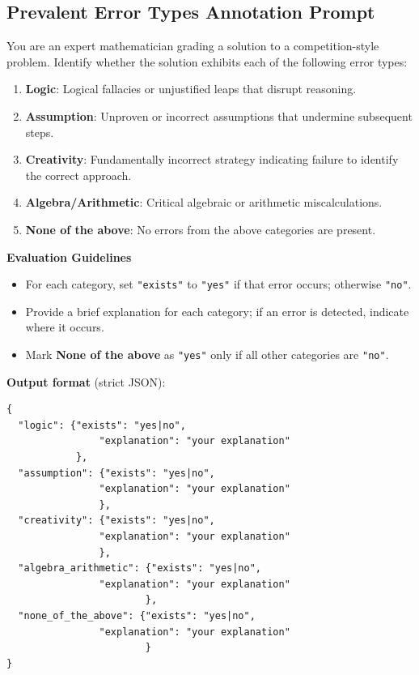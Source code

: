 \documentclass[11pt]{article}
\begin{document}
\subsection{Prevalent Error Types Annotation Prompt}
\label{appendix:prevalent_error_annotation}
\begin{prompt}[title={\footnotesize\texttt{Reasoning Error Detection Prompt}}, label=prompt:error_detection]
You are an expert mathematician grading a solution to a competition-style problem. Identify whether the solution exhibits each of the following error types:

\begin{enumerate}
    \item \textbf{Logic}: Logical fallacies or unjustified leaps that disrupt reasoning.
    \item \textbf{Assumption}: Unproven or incorrect assumptions that undermine subsequent steps.
    \item \textbf{Creativity}: Fundamentally incorrect strategy indicating failure to identify the correct approach.
    \item \textbf{Algebra/Arithmetic}: Critical algebraic or arithmetic miscalculations.
    \item \textbf{None of the above}: No errors from the above categories are present.
\end{enumerate}

\textbf{Evaluation Guidelines}
\begin{itemize}
    \item For each category, set \texttt{"exists"} to \texttt{"yes"} if that error occurs; otherwise \texttt{"no"}.
    \item Provide a brief explanation for each category; if an error is detected, indicate where it occurs.
    \item Mark \textbf{None of the above} as \texttt{"yes"} only if all other categories are \texttt{"no"}.
\end{itemize}

\textbf{Output format} (strict JSON):
\begin{verbatim}
{
  "logic": {"exists": "yes|no",
                "explanation": "your explanation"
            },
  "assumption": {"exists": "yes|no", 
                "explanation": "your explanation"
                },
  "creativity": {"exists": "yes|no", 
                "explanation": "your explanation"
                },
  "algebra_arithmetic": {"exists": "yes|no", 
                "explanation": "your explanation"
                        },
  "none_of_the_above": {"exists": "yes|no", 
                "explanation": "your explanation"
                        }
}
\end{verbatim}
\end{prompt}
\end{document}
